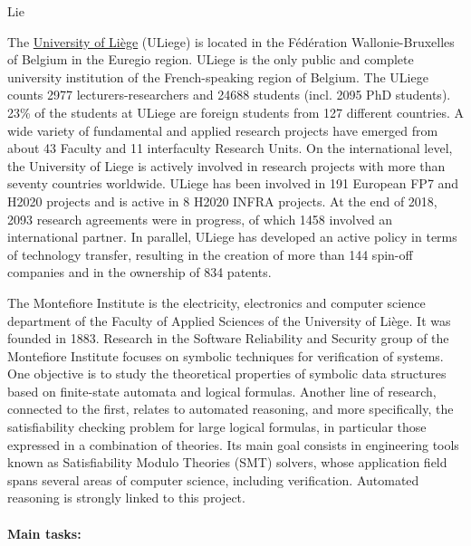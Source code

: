 \begin{sitedescription}{Lie}


The \href{http://www.uliege.be}{University of Liège} (ULiege) is located in the Fédération Wallonie-Bruxelles of Belgium in the Euregio region. ULiege is the only public and complete university institution of the French-speaking region of Belgium. The ULiege counts 2977 lecturers-researchers and 24688 students (incl. 2095 PhD students). 23\% of the students at ULiege are foreign students from 127 different countries. A wide variety of fundamental and applied research projects have emerged from about 43 Faculty and 11 interfaculty Research Units. On the international level, the University of Liege is actively involved in research projects with more than seventy countries worldwide. ULiege has been involved in 191 European FP7 and H2020 projects and is active in 8 H2020 INFRA projects. At the end of 2018, 2093 research agreements were in progress, of which 1458 involved an international partner. In parallel, ULiege has developed an active policy in terms of technology transfer, resulting in the creation of more than 144 spin-off companies and in the ownership of 834 patents.

The Montefiore Institute is the electricity, electronics and computer science
department of the Faculty of Applied Sciences of the University of Liège.  It
was founded in 1883.  Research in the Software Reliability and Security group of
the Montefiore Institute focuses on symbolic techniques for verification of
systems.  One objective is to study the theoretical properties of symbolic data
structures based on finite-state automata and logical formulas.  Another line of
research, connected to the first, relates to automated reasoning, and more
specifically, the satisfiability checking problem for large logical formulas, in
particular those expressed in a combination of theories.  Its main goal consists
in engineering tools known as Satisfiability Modulo Theories (SMT) solvers,
whose application field spans several areas of computer science, including
verification.  Automated reasoning is strongly linked to this project.

\paragraph*{Main tasks:}


\end{sitedescription}
